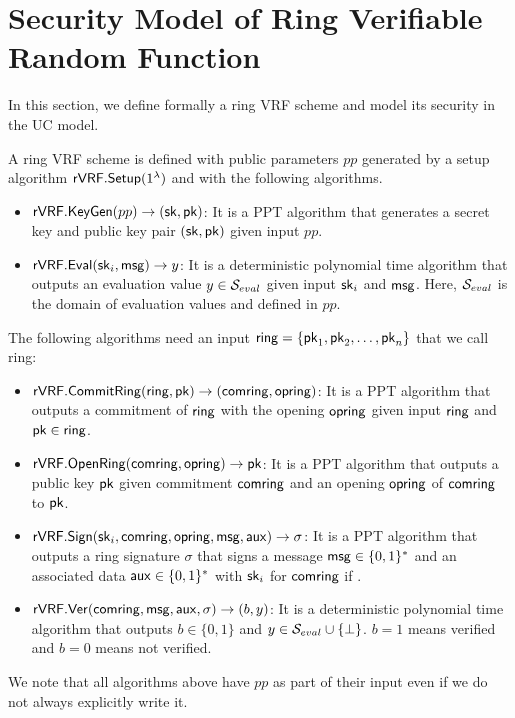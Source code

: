 \newcommand{\Gen}{\ensuremath{\mathsf{Gen}}}

\newcommand{\anonymouskeymap}{\ensuremath{\mathtt{anonymous\_key\_map}}}
\newcommand{\anonymouskeylist}{\mathcal{W}}
\renewcommand{\sim}{\simulator}


\section{Security Model  of Ring Verifiable Random Function}

In this section, we define formally a ring VRF scheme and model its security in the UC model.

\begin{definition} \label{def:ringVRF}	A ring VRF scheme is defined with public parameters $ pp $ generated by a setup algorithm $ {\mathsf{rVRF}}.{\mathsf{Setup}}(1^\lambda) $ and with the following  algorithms.
	
	\begin{itemize}
		\item $ {\mathsf{rVRF}}.{\mathsf{KeyGen}}(pp) \rightarrow (\mathsf{sk},\mathsf{pk})$: It is a PPT algorithm that generates a secret key and public key pair $ (\mathsf{sk},\mathsf{pk}) $ given input $ pp $.
		\item $ {\mathsf{rVRF}}.{\mathsf{Eval}}(\mathsf{sk}_i, \mathsf{msg}) \rightarrow y$: It is a deterministic polynomial time algorithm that outputs an evaluation value $ y \in {\ensuremath{\mathcal{S}}}_{eval}$ given input $ \mathsf{sk}_i $ and $ \mathsf{msg} $. Here, $ {\mathcal{S}}_{eval} $ is the domain  of  evaluation values and defined in $ pp $.
	\end{itemize}
	The following algorithms need an input $ \mathsf{ring} = \{ \mathsf{pk}_1, \mathsf{pk}_2, \ldots, \mathsf{pk}_n \}$ that we call ring:
	\begin{itemize}
		\item $ {\mathsf{rVRF}}.{\mathsf{CommitRing}}(\mathsf{ring}, \mathsf{pk})  \rightarrow (\mathsf{comring}, \mathsf{opring})$: It is a PPT algorithm that outputs a commitment of $ \mathsf{ring} $ with the opening $ \mathsf{opring} $ given input  $ \mathsf{ring} $ and $ \mathsf{pk} \in \mathsf{ring} $.
		\item $ {\mathsf{rVRF}}.{\mathsf{OpenRing}}(\mathsf{comring},\mathsf{opring}) \rightarrow \mathsf{pk} $: It is a PPT algorithm that outputs a public key $ \mathsf{pk}  $ given commitment $ \mathsf{comring} $ and an opening $ \mathsf{opring} $ of $\mathsf{comring}$ to $\mathsf{pk}$.
		\item $ {\mathsf{rVRF}}.{\mathsf{Sign}}(\mathsf{sk}_i, \mathsf{comring},\mathsf{opring}, \mathsf{msg}, \mathsf{aux})\rightarrow \sigma$: It is a PPT algorithm that outputs a ring signature  $\sigma $  that signs a message $ \mathsf{msg} \in \{0,1\}^* $ and an associated data $ \mathsf{aux} \in \{0,1\}^*$ with $ \mathsf{sk}_i$ for $ \mathsf{comring} $ if .
		\item $ {\mathsf{rVRF}}.{\mathsf{Ver}}(\mathsf{comring},\mathsf{msg},\mathsf{aux},\sigma) \rightarrow  (b, y)$: It is a deterministic polynomial time algorithm that outputs  $ b \in \{0,1\} $ and $ y \in{\ensuremath{\mathcal{S}}}_{eval}\cup \{\perp\} $. $ b =1 $ means verified and $ b = 0 $ means not verified.
	\end{itemize}
	We note that  all algorithms above have $ pp $ as part of their input even if we do not always explicitly write it.
\end{definition}


